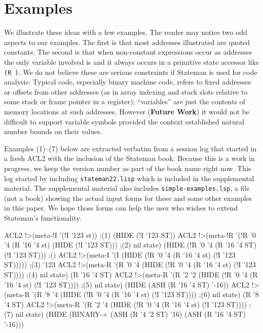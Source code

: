 \documentclass[submission,copyright,creativecommons]{eptcs}
\newcommand{\ptt}[1]{\tt{#1}}
\begin{document}
\section{Examples}

We illustrate these ideas with a few examples.  The reader may notice two odd
aspects to our examples.  The first is that most addresses illustrated are
quoted constants.  The second is that when non-constant expressions occur as
addresses the only variable involved is  and it always occurs in a
primitive state accessor like {\ptt{(R   )}}.  We do not believe
these are serious constraints if Stateman is used for code analysis: Typical
code, especially binary machine code, refers to fixed addresses or offsets
from other addresses (as in array indexing and stack slots relative to some
stack or frame pointer in a register); ``variables'' are just the
contents of memory locations at such addresses.  However ({\bf{Future Work}})
it would not be difficult to support variable symbols provided the context
established natural number bounds on their values.

Examples (1)--(7) below are extracted verbatim from a session log that
started in a fresh ACL2 with the inclusion of the Stateman book.  Because
this is a work in progress, we keep the version number as part of the book
name right now.  This log started by including {\ptt{stateman22.lisp}} which
is included in the supplemental material.  The supplemental material also
includes {\ptt{simple-examples.lsp}}, a file (not a book) showing the actual
input forms for these and some other examples in this paper.  We hope those
forms can help the user who wishes to extend Stateman's functionality.



\begin{acl2p}
ACL2 !>(meta-!I '(!I '123 st))                                         ;{\rm{(1)}}
(HIDE (!I '123 ST))
\vspace*{0.0em}
ACL2 !>(meta-!R '(!R '0 '4 (R '16 '4 st) (HIDE (!I '123 ST)))          ;{\rm{(2)}}
                nil state)
(HIDE (!R '0 '4 (R '16 '4 ST) (!I '123 ST)))                           ;{\rm{()}}
\vspace*{0.0em}
ACL2 !>(meta-I '(I (HIDE (!R '0 '4 (R '16 '4 st)  (!I '123 ST)))))     ;{\rm{(3)}}
'123
\vspace*{0.0em}
ACL2 !>(meta-R '(R '0 '4 (HIDE (!R '0 '4 (R '16 '4 st) (!I '123 ST)))) ;{\rm{(4)}}
               nil state)
(R '16 '4 ST)
\vspace*{0.0em}
ACL2 !>(meta-R '(R '2 '2 (HIDE (!R '0 '4 (R '16 '4 st) (!I '123 ST)))) ;{\rm{(5)}}
               nil state)
(HIDE (ASH (R '16 '4 ST) '-16))
\vspace*{0.0em}
ACL2 !>(meta-R '(R '8 '4 (HIDE (!R '0 '4 (R '16 '4 st) (!I '123 ST)))) ;{\rm{(6)}}
               nil state)
(R '8 '4 ST)
\vspace*{0.0em}
ACL2 !>(meta-R '(R '2 '4 (HIDE (!R '0 '4 (R '16 '4 st) (!I '123 ST)))) ;{\rm{(7)}}
               nil state)
(HIDE (BINARY-+ (ASH (R '4 '2 ST) '16)
                (ASH (R '16 '4 ST) '-16)))
\end{acl2p}
\end{document}
